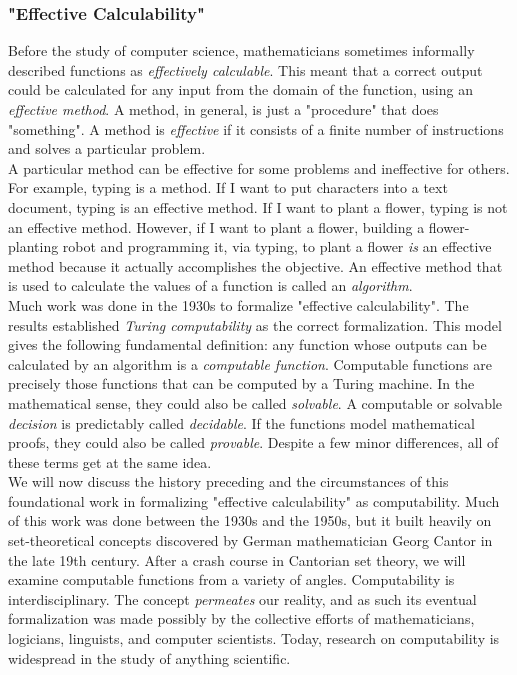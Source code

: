 \subsubsection{"Effective Calculability"}

Before the study of computer science, mathematicians sometimes informally described functions as \textit{effectively calculable}. This meant that a correct output could be calculated for any input from the domain of the function, using an \textit{effective method}. A method, in general, is just a "procedure" that does "something". A method is \textit{effective} if it consists of a finite number of instructions and solves a particular problem. \\

A particular method can be effective for some problems and ineffective for others. For example, typing is a method. If I want to put characters into a text document, typing is an effective method. If I want to plant a flower, typing is not an effective method. However, if I want to plant a flower, building a flower-planting robot and programming it, via typing, to plant a flower \textit{is} an effective method because it actually accomplishes the objective. An effective method that is used to calculate the values of a function is called an \textit{algorithm}. \\

Much work was done in the 1930s to formalize "effective calculability". The results established \textit{Turing computability} as the correct formalization. This model gives the following fundamental definition: any function whose outputs can be calculated by an algorithm is a \textit{computable function}. Computable functions are precisely those functions that can be computed by a Turing machine. In the mathematical sense, they could also be called \textit{solvable}. A computable or solvable \textit{decision} is predictably called \textit{decidable}. If the functions model mathematical proofs, they could also be called \textit{provable}. Despite a few minor differences, all of these terms get at the same idea. \\

We will now discuss the history preceding and the circumstances of this foundational work in formalizing "effective calculability" as computability. Much of this work was done between the 1930s and the 1950s, but it built heavily on set-theoretical concepts discovered by German mathematician Georg Cantor in the late 19th century. After a crash course in Cantorian set theory, we will examine computable functions from a variety of angles. Computability is interdisciplinary. The concept \textit{permeates} our reality, and as such its eventual formalization was made possibly by the collective efforts of mathematicians, logicians, linguists, and computer scientists. Today, research on computability is widespread in the study of anything scientific. \\

